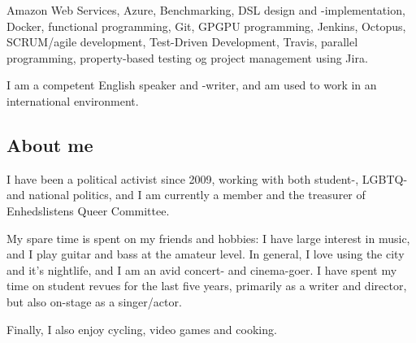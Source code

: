 \documentclass[10pt, a4paper]{article}
\begin{document}
Amazon Web Services, Azure, Benchmarking, DSL design and -implementation, Docker, functional
programming, Git, GPGPU programming, Jenkins, Octopus, SCRUM/agile development,
Test-Driven Development, Travis, parallel programming, property-based testing og
project management using Jira.

I am a competent English speaker and -writer, and am used to work in an
international environment.

\subsection*{About me}
I have been a political activist since 2009, working with both student-, LGBTQ-
and national politics, and I am currently a member and the treasurer of
Enhedslistens Queer Committee.

My spare time is spent on my friends and hobbies: I have large interest in music,
and I play guitar and bass at the amateur level.
In general, I love using the city and it's nightlife, and I am an avid concert- and
cinema-goer. I have spent my time on student revues for the last five years, primarily as a writer
and director, but also on-stage as a singer/actor.

Finally, I also enjoy cycling, video games and cooking.
\end{document}
